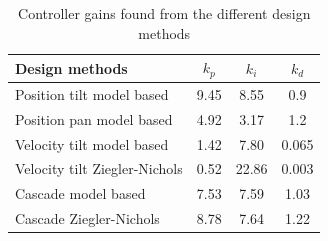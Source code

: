 \documentclass[../../main.tex]{subfiles}
\begin{document}
\begin{table}[]
    \centering
    \begin{tabular}{l c c c}
        Design methods                      & $k_{p}$ & $k_{i}$ & $k_{d}$ \\
        \hline
        Position tilt model based   & 9.45 & 8.55 & 0.9     \\
        Position pan model based    & 4.92 & 3.17 & 1.2     \\
        Velocity tilt model based   & 1.42 & 7.80 & 0.065   \\
        Velocity tilt Ziegler-Nichols & 0.52 & 22.86 & 0.003 \\
        Cascade model based         & 7.53 & 7.59 & 1.03    \\
        Cascade Ziegler-Nichols     & 8.78 & 7.64 & 1.22    \\
        \hline
    \end{tabular}
    \caption{Controller gains found from the different design methods }
    \label{tab:pos_controller_gains}
\end{table}
\end{document}

